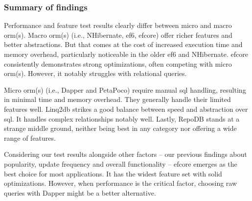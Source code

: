 \subsubsection{Summary of findings}
Performance and feature test results clearly differ between micro and macro \acrshort{orm}(s). Macro \acrshort{orm}(s) (i.e., NHibernate, \acrshort{ef}6, \acrshort{efcore}) offer richer features and better abstractions. But that comes at the cost of increased execution time and memory overhead, particularly noticeable in the older \acrshort{ef}6 and NHibernate. \acrshort{efcore} consistently demonstrates strong optimizations, often competing with micro \acrshort{orm}(s). However, it notably struggles with relational queries. 

Micro \acrshort{orm}(s) (i.e., Dapper and PetaPoco) require manual \acrshort{sql} handling, resulting in minimal time and memory overhead. They generally handle their limited features well. Linq2db strikes a good balance between speed and abstraction over \acrshort{sql}. It handles complex relationships notably well. Lastly, RepoDB stands at a strange middle ground, neither being best in any category nor offering a wide range of features.

Considering our test results alongside other factors -- our previous findings about popularity, update frequency and overall functionality -- \acrshort{efcore} emerges as the best choice for most applications. It has the widest feature set with solid optimizations. However, when performance is the critical factor, choosing raw queries with Dapper might be a better alternative.





